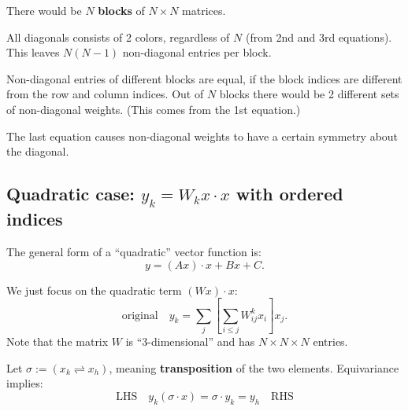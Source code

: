 There would be $N$ \textbf{blocks} of $N \times N$ matrices.

All diagonals consists of 2 colors, regardless of $N$ (from 2nd and 3rd equations).  This leaves $N (N - 1)$ non-diagonal entries per block.

Non-diagonal entries of different blocks are equal, if the block indices are different from the row and column indices.  Out of $N$ blocks there would be 2 different sets of non-diagonal weights.  (This comes from the 1st equation.)

The last equation causes non-diagonal weights to have a certain symmetry about the diagonal.  

\subsection{Quadratic case: $y_k = W_k x \cdot x$ with ordered indices}

The general form of a ``quadratic'' vector function is:
\begin{equation}
y = (A x) \cdot x + B x + C .
\end{equation}

We just focus on the quadratic term $(W x) \cdot x$:
\begin{equation}
\boxed{\mbox{original}} \quad y_k = \sum_j \left[ \sum_{i \le j} W_{ij}^k x_i \right] x_j .
\end{equation}
Note that the matrix $W$ is ``3-dimensional'' and has $N \times N \times N$ entries.

Let $\sigma := (x_k \rightleftharpoons x_h)$, meaning \textbf{transposition} of the two elements.  Equivariance implies:
\begin{equation}
\boxed{\mbox{LHS}} \quad y_k ( \sigma \cdot x) = \sigma \cdot y_k = y_h \quad \boxed{\mbox{RHS}}
\end{equation}

